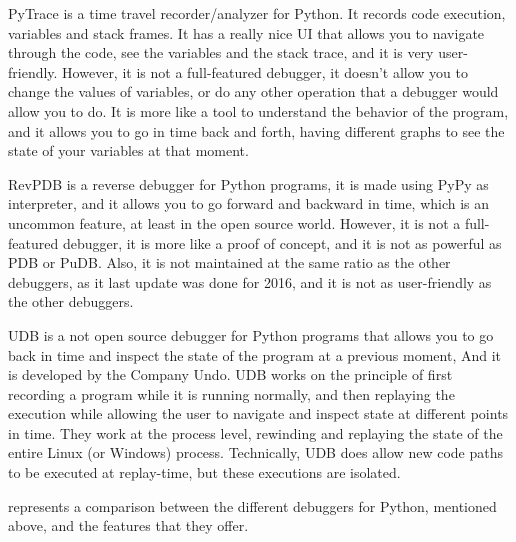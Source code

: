 PyTrace\cite{pytrace} is a time travel recorder/analyzer for Python. It records code execution, variables 
and stack frames. It has a really nice UI that allows you to navigate through the code, 
see the variables and the stack trace, and it is very user-friendly. However, it is not 
a full-featured debugger, it doesn't allow you to change the values of variables, or do 
any other operation that a debugger would allow you to do. It is more like a tool to 
understand the behavior of the program, and it allows you to go in time back and forth, 
having different graphs to see the state of your variables at that moment.

\ac{RevPDB}\cite{revdeb} is a reverse debugger for Python programs, it is made using PyPy as interpreter,
and it allows you to go forward and backward in time, which is an uncommon feature, at least 
in the open source world. However, it is not a full-featured debugger, it is more like a 
proof of concept, and it is not as powerful as \ac{PDB} or PuDB. Also, it is not maintained at 
the same ratio as the other debuggers, as it last update was done for 2016, and it is not as 
user-friendly as the other debuggers.

\ac{UDB}\cite{udb} is a not open source debugger for Python programs that allows you to go back in time 
and inspect the state of the program at a previous moment, And it is developed by the Company 
Undo. \ac{UDB} works on the principle of first recording 
a program while it is running normally, and then replaying the execution while allowing the 
user to navigate and inspect state at different points in time. They work at the process 
level, rewinding and replaying the state of the entire Linux (or Windows) process. Technically, 
\ac{UDB} does allow new code paths to be executed at replay-time, but these executions are 
isolated.

 represents a comparison between the different debuggers for Python, 
mentioned above, and the features that they offer. 

